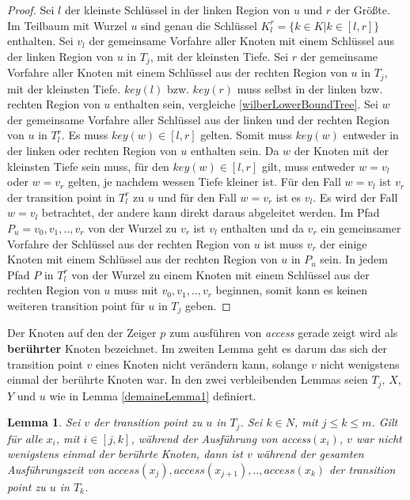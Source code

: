 \documentclass[a4paper,12pt]{article}
\begin{document}
\begin{proof}
Sei $l$ der kleinste Schlüssel in der linken Region von $u$ und $r$ der Größte. Im Teilbaum mit Wurzel $u$ sind genau die Schlüssel $K^r_l = \{k \in K \vert k \in \left[l,r\right]\}$ enthalten. Sei $v_l$ der gemeinsame Vorfahre aller Knoten mit einem Schlüssel aus der linken Region von $u$ in $T_j$, mit der kleinsten Tiefe. Sei $r$ der gemeinsame Vorfahre aller Knoten mit einem Schlüssel aus der rechten Region von $u$ in $T_j$, mit der kleinsten Tiefe. $\mathit{key\left(l\right)}$ bzw. $\mathit{key\left(r\right)}$ muss selbst in der linken bzw. rechten Region von $u$ enthalten sein, vergleiche \ref{wilberLowerBoundTree}. Sei $w$ der gemeinsame Vorfahre aller Schlüssel aus der linken und der rechten Region von $u$ in $T^r_l$. Es muss $\mathit{key}\left(w\right) \in \left[l,r\right]$ gelten. Somit muss  $\mathit{key}\left(w\right)$ entweder in der linken oder rechten Region von $u$ enthalten sein. Da $w$ der Knoten mit der kleinsten Tiefe sein muss, für den  $\mathit{key\left(w\right)} \in \left[l,r\right]$  gilt, muss entweder $w = v_l$ oder $w = v_r$ gelten, je nachdem wessen Tiefe kleiner ist. Für den Fall $w = v_l$ ist $v_r$ der transition point in $T^r_l$ zu $u$ und für den Fall $w = v_r$ ist es $v_l$.
Es wird der Fall $w = v_l$ betrachtet, der andere kann direkt daraus abgeleitet werden. Im Pfad $P_u = v_0,v_1,..,v_r$ von der Wurzel zu $v_r$ ist $v_l$ enthalten und da $v_r$ ein gemeinsamer Vorfahre der Schlüssel aus der rechten Region von $u$ ist muss $v_r$ der einige Knoten mit einem Schlüssel aus der rechten Region von $u$ in $P_u$ sein. In jedem Pfad $P$ in $T_l^r$ von der Wurzel zu einem Knoten mit einem Schlüssel aus der rechten Region von $u$ muss mit $v_0,v_1,..,v_r$ beginnen, somit kann es keinen weiteren transition point für $u$ in $T_j$ geben. 
	
\end{proof}
\noindent Der Knoten auf den der Zeiger $p$ zum ausführen von \textit{access} gerade zeigt wird als \textbf{berührter} Knoten bezeichnet.
 Im zweiten Lemma geht es darum das sich der transition point $v$ eines Knoten nicht verändern kann, solange $v$ nicht wenigstens einmal der berührte Knoten war. In den zwei verbleibenden Lemmas seien  $T_j$, $X$, $Y$ und $u$ wie in  Lemma \ref{demaineLemma1} definiert. 



\newtheorem{Lemma5}{Lemma}[section] \label{lemmaDemaine2}
\begin{Lemma5} \label{demaineLemma2}
Sei $v$ der transition point zu $u$ in $T_j$.  Sei  $k \in \mathit{N}$, mit $j \leq k \leq m$. Gilt für alle $x_i$, mit $i \in \left[j,k\right]$, während der Ausführung von \textit{access}$\left(x_i\right)$,  $v$ war nicht wenigstens einmal der berührte Knoten, dann ist $v$ während der gesamten Ausführungszeit von $\textit{access}\left(x_j\right),\textit{access}\left(x_{j+1}\right),..,\textit{access}\left(x_k\right)$ der transition point zu $u$ in $T_k$. 
\end{Lemma5}
\end{document}
